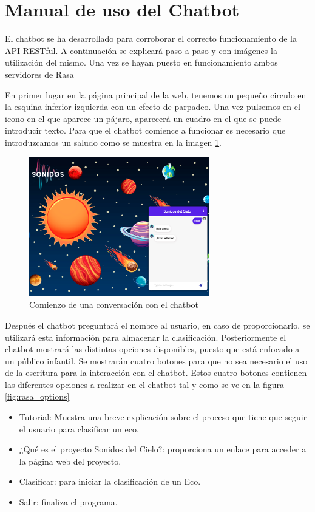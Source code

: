 \newpage
\section{Manual de uso del Chatbot}

El chatbot se ha desarrollado para corroborar el correcto funcionamiento de la API RESTful. A continuación se explicará paso a paso y con imágenes la utilización del mismo. Una vez se hayan puesto en funcionamiento ambos servidores de Rasa

En primer lugar en la página principal de la web, tenemos un pequeño circulo en la esquina inferior izquierda con un efecto de parpadeo. Una vez pulsemos en el icono en el que aparece un pájaro, aparecerá un cuadro en el que se puede introducir texto. Para que el chatbot comience a funcionar es necesario que introduzcamos un saludo como se muestra en la imagen \ref{fig:init_rasa}.

\begin{figure}[H]
    \centering
    \includegraphics[width=0.7\textwidth]{include/resultados/RasaInit.png}
    \caption{Comienzo de una conversación con el chatbot}
    \label{fig:init_rasa}
\end{figure}

Después el chatbot preguntará el nombre al usuario, en caso de proporcionarlo, se utilizará esta información para almacenar la clasificación. Posteriormente el chatbot mostrará las distintas opciones disponibles, puesto que está enfocado a un público infantil. Se mostrarán cuatro botones para que no sea necesario el uso de la escritura para la interacción con el chatbot. Estos cuatro botones contienen las diferentes opciones a realizar en el chatbot tal y como se ve en la figura \ref{fig:rasa_options}

\begin{itemize}
    \item Tutorial: Muestra una breve explicación sobre el proceso que tiene que seguir el usuario para clasificar un eco.
    \item ¿Qué es el proyecto Sonidos del Cielo?: proporciona un enlace para acceder a la página web del proyecto.
    \item Clasificar: para iniciar la clasificación de un Eco.
    \item Salir: finaliza el programa.
\end{itemize}

